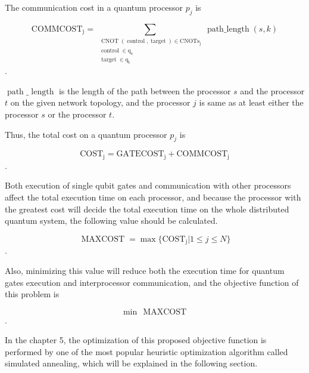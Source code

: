The communication cost in a quantum processor $p_j$ is 

 \begin{equation}
 \operatorname{COMMCOST_j} = \sum_{ \substack{ \operatorname{CNOT} ( \operatorname{control},  \operatorname{target}) \in  \operatorname{CNOTs_{j}} \\  \operatorname{control} \in  \operatorname{q_s} \\  \operatorname{target} \in  \operatorname{q_t}}} \operatorname{path\_length}(s, k)
 \end{equation}.
 
$\operatorname{path}\_\operatorname{length}$ is the length of the path between the processor $s$ and the processor $t$ on the given network topology, and the processor $j$ is same as at least either the processor $s$ or the processor $t$.

Thus, the total cost on a quantum processor $p_j$ is 

 \begin{equation}
 \operatorname{COST_j} =  \operatorname{GATECOST_j} +  \operatorname{COMMCOST_j}
 \end{equation}.

Both execution of single qubit gates and communication with other processors affect the total execution time on each processor, and because the processor with the greatest cost will decide the total execution time on the whole distributed quantum system, the following value should be calculated.

 \begin{equation}
 \operatorname{MAXCOST} = \max \{ \operatorname{COST_j} | 1 \leq j \leq N\}
 \end{equation}.

Also, minimizing this value will reduce both the execution time for quantum gates execution and interprocessor communication, and the objective function of this problem is 

 \begin{equation}
  \operatorname{min}\, \operatorname{MAXCOST}
  \end{equation}.
  
  In the chapter 5, the optimization of this proposed objective function is performed by one of the most popular heuristic optimization algorithm called simulated annealing, which will be explained in the following section.

\newpage

